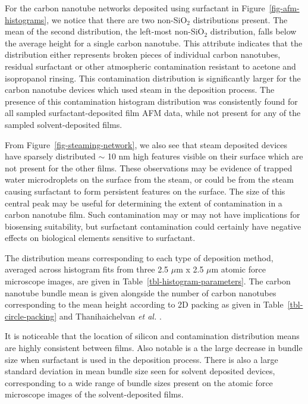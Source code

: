 \documentclass[
  a4paper,
]{scrbook}
\begin{document}
For the carbon nanotube networks deposited using surfactant in
Figure~\ref{fig-afm-histograms}, we notice that there are two
non-SiO\(_2\) distributions present. The mean of the second
distribution, the left-most non-SiO\(_2\) distribution, falls below the
average height for a single carbon nanotube. This attribute indicates
that the distribution either represents broken pieces of individual
carbon nanotubes, residual surfactant or other atmospheric contamination
resistant to acetone and isopropanol rinsing. This contamination
distribution is significantly larger for the carbon nanotube devices
which used steam in the deposition process. The presence of this
contamination histogram distribution was consistently found for all
sampled surfactant-deposited film AFM data, while not present for any of
the sampled solvent-deposited films.

From Figure~\ref{fig-steaming-network}, we also see that steam deposited
devices have sparsely distributed \(\sim\) 10 nm high features visible
on their surface which are not present for the other films. These
observations may be evidence of trapped water microdroplets on the
surface from the steam, or could be from the steam causing surfactant to
form persistent features on the surface. The size of this central peak
may be useful for determining the extent of contamination in a carbon
nanotube film. Such contamination may or may not have implications for
biosensing suitability, but surfactant contamination could certainly
have negative effects on biological elements sensitive to surfactant.

The distribution means corresponding to each type of deposition method,
averaged across histogram fits from three 2.5 \(\mu\)m x 2.5 \(\mu\)m
atomic force microscope images, are given in
Table~\ref{tbl-histogram-parameters}. The carbon nanotube bundle mean is
given alongside the number of carbon nanotubes corresponding to the mean
height according to 2D packing as given in
Table~\ref{tbl-circle-packing} and Thanihaichelvan \emph{et al.}
\autocite{Thanihaichelvan2018}.

It is noticeable that the location of silicon and contamination
distribution means are highly consistent between films. Also notable is
a the large decrease in bundle size when surfactant is used in the
deposition process. There is also a large standard deviation in mean
bundle size seen for solvent deposited devices, corresponding to a wide
range of bundle sizes present on the atomic force microscope images of
the solvent-deposited films.
\end{document}
